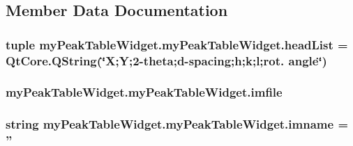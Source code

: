 \subsection{Member Data Documentation}
\hypertarget{classmy_peak_table_widget_1_1my_peak_table_widget_a6b0c16aabbedcc000d20542e5d4b3e08}{
\subsubsection[{head\-List}]{\setlength{\rightskip}{0pt plus 5cm}tuple my\-Peak\-Table\-Widget.\-my\-Peak\-Table\-Widget.\-head\-List = Qt\-Core.\-Q\-String(\char`\"{}X;Y;2-\/theta;d-\/spacing;h;k;l;rot. angle\char`\"{})\hspace{0.3cm}{\ttfamily [static]}}}\label{classmy_peak_table_widget_1_1my_peak_table_widget_a6b0c16aabbedcc000d20542e5d4b3e08}
\hypertarget{classmy_peak_table_widget_1_1my_peak_table_widget_ac482a5f93ba7061a3a6e8c6d46e2e26b}{
\subsubsection[{imfile}]{\setlength{\rightskip}{0pt plus 5cm}my\-Peak\-Table\-Widget.\-my\-Peak\-Table\-Widget.\-imfile}}\label{classmy_peak_table_widget_1_1my_peak_table_widget_ac482a5f93ba7061a3a6e8c6d46e2e26b}
\hypertarget{classmy_peak_table_widget_1_1my_peak_table_widget_ae072cce7f45a7c9a7c4a4d6ea9887593}{
\subsubsection[{imname}]{\setlength{\rightskip}{0pt plus 5cm}string my\-Peak\-Table\-Widget.\-my\-Peak\-Table\-Widget.\-imname = ''\hspace{0.3cm}{\ttfamily [static]}}}\label{classmy_peak_table_widget_1_1my_peak_table_widget_ae072cce7f45a7c9a7c4a4d6ea9887593}
